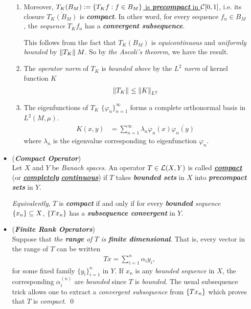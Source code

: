 \documentclass[11pt]{article}
\begin{document}
\begin{itemize}
\begin{remark}
\begin{enumerate}
\item Moreover, \underline{$T_K(B_M) := \left\{T_{K}f: f\in B_M\right\}$ is \emph{\textbf{precompact}} in ${\mathcal C}[0,1]$}, i.e. its closure $\overline{T_K(B_M)}$ is \emph{\textbf{compact}}. In other word, for every sequence $f_n \in B_M$, the \emph{sequence} $T_K f_n$  has a \emph{\textbf{convergent subsequence}}. 

This follows from the fact that $T_K(B_M)$ is \emph{equicontinuous} and \emph{uniformly bounded} by $\left\|T_{K}\right\|_{}M$. So by \emph{the Ascoli's theorem}, we have the result.

\item The \emph{operator norm} of $T_K$ is \emph{bounded above} by the \emph{$L^2$ norm} of kernel function $K$
\begin{align*}
\left\|T_K\right\|_{} \le \left\|K\right\|_{L^2}
\end{align*}

\item The eigenfunctions of $T_K$ $\{\varphi_n\}_{n=1}^{\infty}$ forms a complete orthonormal basis in $L^2(M, \mu)$.  
\begin{align*}
K(x,y) &= \sum_{n=1}^{\infty}\lambda_{n}\varphi_n(x)\overline{\varphi_n(y)}
\end{align*} where $\lambda_n$ is the eigenvalue corresponding to eigenfunction $\varphi_n$.
\end{enumerate}
\end{remark}

\item \begin{definition} (\emph{\textbf{Compact Operator}})\\
Let $X$ and $Y$ be \emph{Banach spaces}. An operator $T \in {\mathcal L}(X, Y)$ is called \underline{\emph{\textbf{compact}}} (or \underline{\emph{\textbf{completely}}} \underline{\emph{\textbf{continuous}}}) if $T$ takes \emph{\textbf{bounded sets}} in $X$ into \emph{\textbf{precompact sets}} in $Y$. 

\emph{Equivalently}, $T$ is \emph{\textbf{compact}} if and only if for every \emph{\textbf{bounded} sequence} $\left\{x_n\right\} \subseteq X$, $\left\{T x_n\right\}$ has a \emph{\textbf{subsequence convergent}} in $Y$. 
\end{definition}

\item \begin{example} (\emph{\textbf{Finite Rank Operators}}) \\
Suppose that \emph{the \textbf{range} of $T$ is \textbf{finite  dimensional}}. That is, every vector in the range of $T$ can be written 
\begin{align*}
T x = \sum_{i=1}^{n}\alpha_i y_i,
\end{align*} for some fixed family $\{y_i\}_{i=1}^{n}$ in $Y$. If $x_n$ is any \emph{bounded sequence} in $X$, the corresponding $\alpha_i^{(n)}$ are \emph{bounded} since $T$ is \emph{bounded}. The usual subsequence trick allows one to extract a \emph{convergent subsequence} from $\left\{T x_n\right\}$ which proves that $T$ is \emph{compact}. \qed
\end{example}


\end{itemize}
\end{document}
